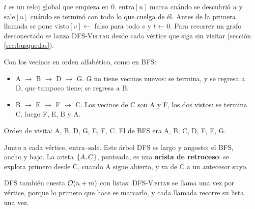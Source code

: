 \documentclass[11pt,letterpaper]{article}
\begin{document}
$t$ es un reloj global que empieza en $0$. $\text{entra}[u]$ marca
cuándo se descubrió $u$ y $\text{sale}[u]$ cuándo se terminó con todo
lo que cuelga de él. Antes de la primera llamada se pone
$\text{visto}[v] \gets$ falso para todo $v$ y $t \gets 0$. Para
recorrer un grafo desconectado se lanza \textsc{DFS-Visitar} desde
cada vértice que siga sin visitar (sección \ref{sec:busquedas}).

\begin{ejemplo}
  Con los vecinos en orden alfabético, como en BFS:
  \begin{itemize}[itemsep=0.1em]
    \item A $\to$ B $\to$ D $\to$ G. G no tiene vecinos nuevos: se
          termina, y se regresa a D, que tampoco tiene; se regresa a B.
    \item B $\to$ E $\to$ F $\to$ C. Los vecinos de C son A y F, los dos
          vistos: se termina C, luego F, E, B y A.
  \end{itemize}
  Orden de visita: A, B, D, G, E, F, C. El de BFS era A, B, C, D, E, F,
  G.
  \begin{center}
  \end{center}
  Junto a cada vértice, $\text{entra}$--$\text{sale}$. Este árbol DFS
  es largo y angosto; el BFS, ancho y bajo. La arista $\left\{ A, C \right\}$,
  punteada, es una \textbf{arista de retroceso}: se explora primero
  desde C, cuando A sigue abierto, y va de C a un antecesor suyo.
\end{ejemplo}

DFS también cuesta $\mathcal{O}\!\left(n + m\right)$ con listas: \textsc{DFS-Visitar} se
llama una vez por vértice, porque lo primero que hace es marcarlo, y
cada llamada recorre su lista una vez.
\end{document}
